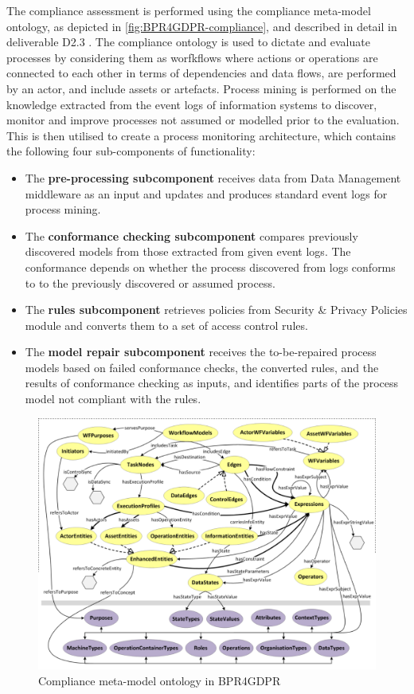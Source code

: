 The compliance assessment is performed using the compliance meta-model ontology, as depicted in \autoref{fig:BPR4GDPR-compliance}, and described in detail in deliverable D2.3 \cite{dellas_d2.3_2019}. The compliance ontology is used to dictate and evaluate processes by considering them as worfkflows where actions or operations are connected to each other in terms of dependencies and data flows, are performed by an actor, and include assets or artefacts. Process mining is performed on the knowledge extracted from the event logs of information systems to discover, monitor and improve processes not assumed or modelled prior to the evaluation. This is then utilised to create a process monitoring architecture, which contains the following four sub-components of functionality:
\begin{itemize}
    \item The \textbf{pre-processing subcomponent} receives data from Data Management middleware as an input and updates and produces standard event logs for process mining. 
    \item The \textbf{conformance checking subcomponent} compares previously discovered models from those extracted from given event logs. The conformance depends on whether the process discovered from logs conforms to to the previously discovered or assumed process.
    \item The \textbf{rules subcomponent} retrieves policies from Security \& Privacy Policies module and converts them to a set of access control rules.
    \item The \textbf{model repair subcomponent} receives the to-be-repaired process models based on failed conformance checks, the converted rules, and the results of conformance checking as inputs, and identifies  parts of the process model not compliant with the rules. 
\end{itemize}

\begin{figure}[htbp]
    \centering
    \includegraphics[width=\linewidth]{img/BPR4GDPR_compliance.png}
    \caption{Compliance meta-model ontology in BPR4GDPR \cite{dellas_d2.3_2019}}
    \label{fig:BPR4GDPR-compliance}
\end{figure}

